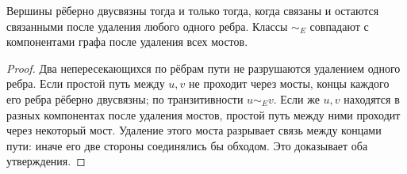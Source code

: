 \begin{theorem}
Вершины рёберно двусвязны тогда и только тогда, когда связаны и остаются
связанными после удаления любого одного ребра. Классы \(\sim_E\)
совпадают с компонентами графа после удаления всех мостов.
\end{theorem}
\begin{proof}
Два непересекающихся по рёбрам пути не разрушаются удалением одного ребра.
Если простой путь между \(u,v\) не проходит через мосты, концы каждого
его ребра рёберно двусвязны; по транзитивности \(u\sim_E v\).
Если же \(u,v\) находятся в разных компонентах после удаления мостов,
простой путь между ними проходит через некоторый мост.
Удаление этого моста разрывает связь между концами пути:
иначе его две стороны соединялись бы обходом. Это доказывает оба утверждения.
\end{proof}
